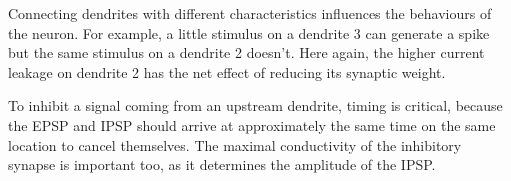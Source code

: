 \documentclass[a4paper, 10pt, conference]{ieeeconf}      %
\begin{document}
Connecting dendrites with different characteristics influences the behaviours of the neuron. For example, a little stimulus on a dendrite 3 can generate a spike but the same stimulus on a dendrite 2 doesn't. Here again, the higher current leakage on dendrite 2 has the net effect of reducing its synaptic weight.

To inhibit a signal coming from an upstream dendrite, timing is critical, because the EPSP and IPSP should arrive at approximately the same time on the same location to cancel themselves. The maximal conductivity of the inhibitory synapse is important too, as it determines the amplitude of the IPSP.

\nocite{*}




\end{document}
